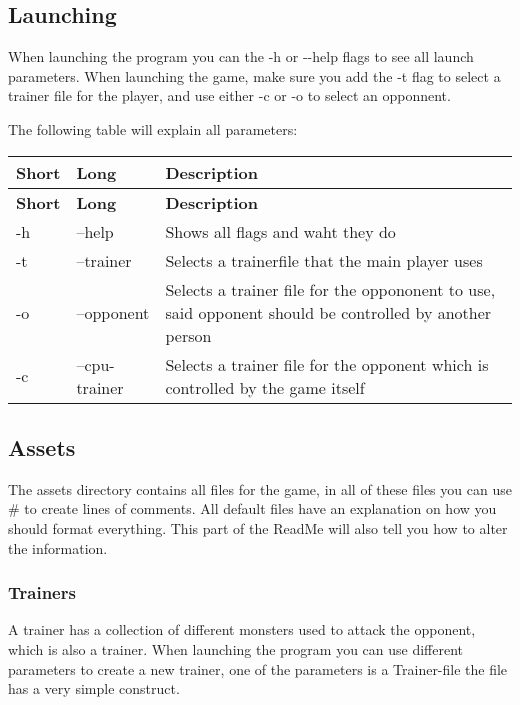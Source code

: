 \subsection*{Launching}

When launching the program you can the {\ttfamily -\/h} or {\ttfamily -\/-\/help} flags to see all launch parameters. When launching the game, make sure you add the {\ttfamily -\/t} flag to select a trainer file for the player, and use either {\ttfamily -\/c} or {\ttfamily -\/o} to select an opponnent.

The following table will explain all parameters\+:

\tabulinesep=1mm
\begin{longtabu} spread 0pt [c]{*{3}{|X[-1]}|}
\hline
\rowcolor{\tableheadbgcolor}\textbf{ Short }&\textbf{ Long }&\textbf{ Description  }\\
\endfirsthead
\hline
\endfoot
\hline
\rowcolor{\tableheadbgcolor}\textbf{ Short }&\textbf{ Long }&\textbf{ Description  }\\
\endhead
-\/h &--help &Shows all flags and waht they do \\
-\/t &--trainer &Selects a trainerfile that the main player uses \\
-\/o &--opponent &Selects a trainer file for the oppononent to use, said opponent should be controlled by another person \\
-\/c &--cpu-\/trainer &Selects a trainer file for the opponent which is controlled by the game itself \\
\end{longtabu}
\subsection*{Assets}

The {\ttfamily assets} directory contains all files for the game, in all of these files you can use {\ttfamily \#} to create lines of comments. All default files have an explanation on how you should format everything. This part of the Read\+Me will also tell you how to alter the information.

\subsubsection*{Trainers}

A trainer has a collection of different monsters used to attack the opponent, which is also a trainer. When launching the program you can use different parameters to create a new trainer, one of the parameters is a \textquotesingle{}Trainer-\/file\textquotesingle{} the file has a very simple construct.

